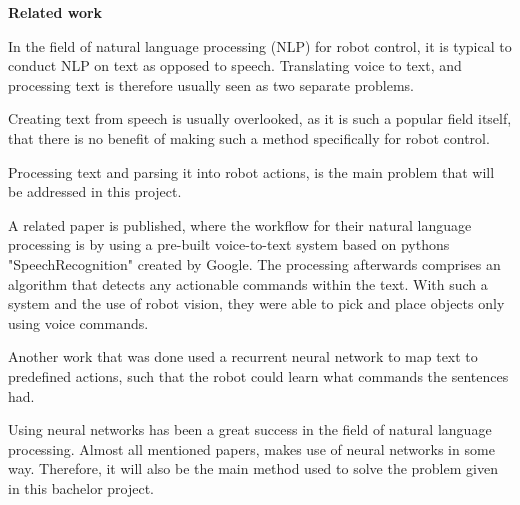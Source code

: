 \textbf{\Large{Related work}}

In the field of natural language processing (NLP)
for robot control, it is typical to conduct
NLP on text as opposed to speech\cite{Method3}\cite{Method1}\cite{Method2}\cite{TextNotSpeech1}. 
Translating voice to text, and processing 
text is therefore usually seen as two separate problems.

Creating text from speech is usually overlooked, 
as it is such a popular field itself, that there is no benefit 
of making such a method specifically for robot control\cite{SpeechToText1}.

Processing text and parsing it into robot actions, is the main problem that 
will be addressed in this project.

\vspace{2mm}
A related paper is published, where the workflow for their natural language processing 
is by using a pre-built voice-to-text system based on pythons "SpeechRecognition" 
created by Google. The processing afterwards comprises an algorithm that detects 
any actionable commands within the text. With such a system and 
the use of robot vision, they were able to pick and place objects only using 
voice commands\cite{Method1}.
\vspace{2mm}

Another work that was done used a recurrent neural network to map text to 
predefined actions, such that the robot could learn what commands the 
sentences had\cite{Method3}.
\vspace{2mm}

Using neural networks has been a great success in the field of natural language 
processing\cite{NN_rocks}\cite{vaswani2017attention}\cite{devlin2018bert}. Almost all mentioned papers, makes use of neural networks 
in some way\cite{Method1}\cite{Method2}\cite{TextNotSpeech1}. 
Therefore, it will also be the main method used to solve the problem given 
in this bachelor project.








